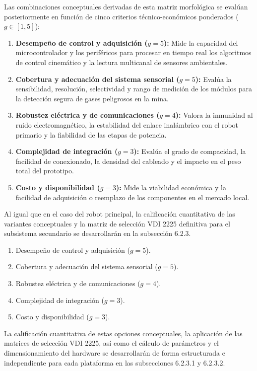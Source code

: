 Las combinaciones conceptuales derivadas de esta matriz morfológica se evalúan posteriormente en función de cinco criterios técnico-económicos ponderados ($g \in [1,5]$):

\begin{enumerate}
    \item \textbf{Desempeño de control y adquisición ($g = 5$):} Mide la capacidad del microcontrolador y los periféricos para procesar en tiempo real los algoritmos de control cinemático y la lectura multicanal de sensores ambientales.
    \item \textbf{Cobertura y adecuación del sistema sensorial ($g = 5$):} Evalúa la sensibilidad, resolución, selectividad y rango de medición de los módulos para la detección segura de gases peligrosos en la mina.
    \item \textbf{Robustez eléctrica y de comunicaciones ($g = 4$):} Valora la inmunidad al ruido electromagnético, la estabilidad del enlace inalámbrico con el robot primario y la fiabilidad de las etapas de potencia.
    \item \textbf{Complejidad de integración ($g = 3$):} Evalúa el grado de compacidad, la facilidad de conexionado, la densidad del cableado y el impacto en el peso total del prototipo.
    \item \textbf{Costo y disponibilidad ($g = 3$):} Mide la viabilidad económica y la facilidad de adquisición o reemplazo de los componentes en el mercado local.
\end{enumerate}

Al igual que en el caso del robot principal, la calificación cuantitativa de las variantes conceptuales y la matriz de selección VDI 2225 definitiva para el subsistema secundario se desarrollarán en la subsección 6.2.3.

\begin{enumerate}
    \item Desempeño de control y adquisición ($g = 5$).
    \item Cobertura y adecuación del sistema sensorial ($g = 5$).
    \item Robustez eléctrica y de comunicaciones ($g = 4$).
    \item Complejidad de integración ($g = 3$).
    \item Costo y disponibilidad ($g = 3$).
\end{enumerate}

La calificación cuantitativa de estas opciones conceptuales, la aplicación de las matrices de selección VDI 2225, así como el cálculo de parámetros y el dimensionamiento del hardware se desarrollarán de forma estructurada e independiente para cada plataforma en las subsecciones 6.2.3.1 y 6.2.3.2.

